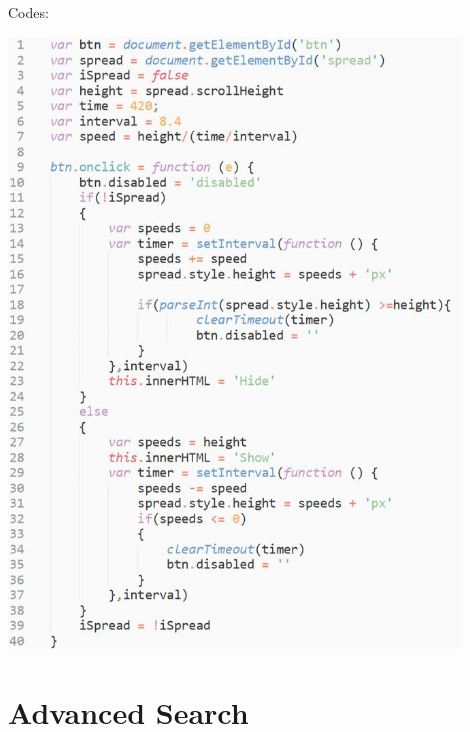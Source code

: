 \documentclass[10pt,twoside,a4paper,titlepage]{article}
\begin{document}
		Codes:\newline\par
		\includegraphics[width=0.9\textwidth]{gzl/11.jpg}

	\newpage

	\section{Advanced Search}
\end{document}
